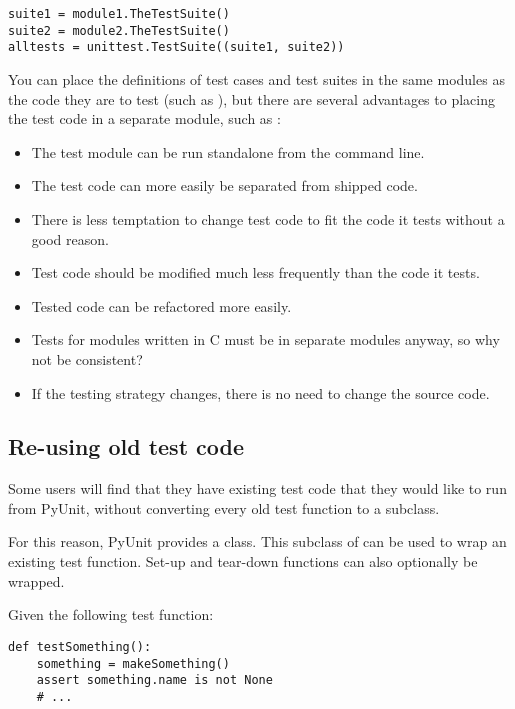 \begin{verbatim}
suite1 = module1.TheTestSuite()
suite2 = module2.TheTestSuite()
alltests = unittest.TestSuite((suite1, suite2))
\end{verbatim}

You can place the definitions of test cases and test suites in the
same modules as the code they are to test (such as ),
but there are several advantages to placing the test code in a
separate module, such as :

\begin{itemize}
  \item The test module can be run standalone from the command line.
  \item The test code can more easily be separated from shipped code.
  \item There is less temptation to change test code to fit the code
        it tests without a good reason.
  \item Test code should be modified much less frequently than the
        code it tests.
  \item Tested code can be refactored more easily.
  \item Tests for modules written in C must be in separate modules
        anyway, so why not be consistent?
  \item If the testing strategy changes, there is no need to change
        the source code.
\end{itemize}


\subsection{Re-using old test code
            \label{legacy-unit-tests}}

Some users will find that they have existing test code that they would
like to run from PyUnit, without converting every old test function to
a  subclass.

For this reason, PyUnit provides a  class.
This subclass of  can be used to wrap an existing test
function.  Set-up and tear-down functions can also optionally be
wrapped.

Given the following test function:

\begin{verbatim}
def testSomething():
    something = makeSomething()
    assert something.name is not None
    # ...
\end{verbatim}


